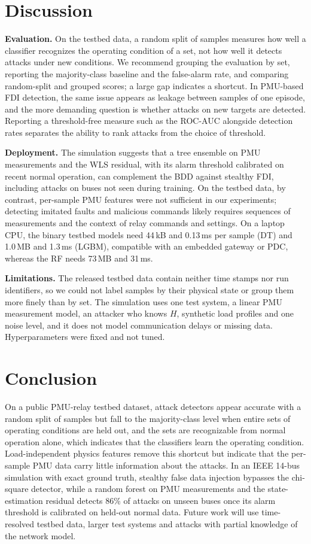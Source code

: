 \documentclass[conference]{IEEEtran}
\begin{document}
\section{Discussion}
\textbf{Evaluation.} On the testbed data, a random split of samples measures how well a classifier recognizes the operating condition of a set, not how well it detects attacks under new conditions. We recommend grouping the evaluation by set, reporting the majority-class baseline and the false-alarm rate, and comparing random-split and grouped scores; a large gap indicates a shortcut. In PMU-based FDI detection, the same issue appears as leakage between samples of one episode, and the more demanding question is whether attacks on new targets are detected. Reporting a threshold-free measure such as the ROC-AUC alongside detection rates separates the ability to rank attacks from the choice of threshold.

\textbf{Deployment.} The simulation suggests that a tree ensemble on PMU measurements and the WLS residual, with its alarm threshold calibrated on recent normal operation, can complement the BDD against stealthy FDI, including attacks on buses not seen during training. On the testbed data, by contrast, per-sample PMU features were not sufficient in our experiments; detecting imitated faults and malicious commands likely requires sequences of measurements and the context of relay commands and settings. On a laptop CPU, the binary testbed models need 44\,kB and 0.13\,ms per sample (DT) and 1.0\,MB and 1.3\,ms (LGBM), compatible with an embedded gateway or PDC, whereas the RF needs 73\,MB and 31\,ms.

\textbf{Limitations.} The released testbed data contain neither time stamps nor run identifiers, so we could not label samples by their physical state or group them more finely than by set. The simulation uses one test system, a linear PMU measurement model, an attacker who knows $H$, synthetic load profiles and one noise level, and it does not model communication delays or missing data. Hyperparameters were fixed and not tuned.

\section{Conclusion}
On a public PMU-relay testbed dataset, attack detectors appear accurate with a random split of samples but fall to the majority-class level when entire sets of operating conditions are held out, and the sets are recognizable from normal operation alone, which indicates that the classifiers learn the operating condition. Load-independent physics features remove this shortcut but indicate that the per-sample PMU data carry little information about the attacks. In an IEEE 14-bus simulation with exact ground truth, stealthy false data injection bypasses the chi-square detector, while a random forest on PMU measurements and the state-estimation residual detects 86\% of attacks on unseen buses once its alarm threshold is calibrated on held-out normal data. Future work will use time-resolved testbed data, larger test systems and attacks with partial knowledge of the network model.
\end{document}
